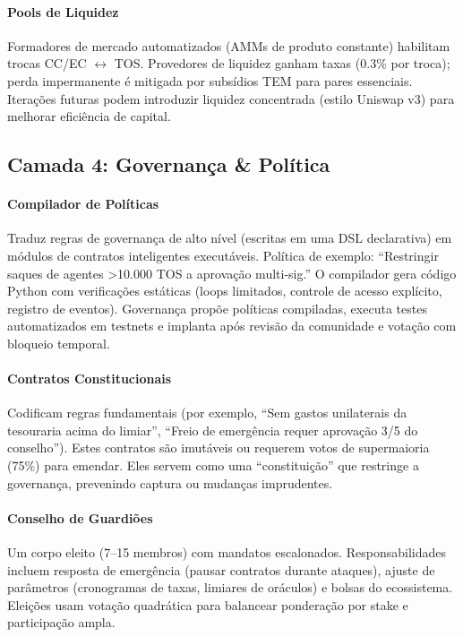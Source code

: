 \documentclass[11pt]{article}
\begin{document}
\paragraph{Pools de Liquidez} Formadores de mercado automatizados (AMMs de produto constante) habilitam trocas CC/EC $\leftrightarrow$ TOS. Provedores de liquidez ganham taxas (0.3\% por troca); perda impermanente é mitigada por subsídios TEM para pares essenciais. Iterações futuras podem introduzir liquidez concentrada (estilo Uniswap v3) para melhorar eficiência de capital.

\subsection{Camada 4: Governança \& Política}
\paragraph{Compilador de Políticas} Traduz regras de governança de alto nível (escritas em uma DSL declarativa) em módulos de contratos inteligentes executáveis. Política de exemplo: ``Restringir saques de agentes >10.000 TOS a aprovação multi-sig.'' O compilador gera código Python com verificações estáticas (loops limitados, controle de acesso explícito, registro de eventos). Governança propõe políticas compiladas, executa testes automatizados em testnets e implanta após revisão da comunidade e votação com bloqueio temporal.

\paragraph{Contratos Constitucionais} Codificam regras fundamentais (por exemplo, ``Sem gastos unilaterais da tesouraria acima do limiar'', ``Freio de emergência requer aprovação 3/5 do conselho''). Estes contratos são imutáveis ou requerem votos de supermaioria (75\%) para emendar. Eles servem como uma ``constituição'' que restringe a governança, prevenindo captura ou mudanças imprudentes.

\paragraph{Conselho de Guardiões} Um corpo eleito (7--15 membros) com mandatos escalonados. Responsabilidades incluem resposta de emergência (pausar contratos durante ataques), ajuste de parâmetros (cronogramas de taxas, limiares de oráculos) e bolsas do ecossistema. Eleições usam votação quadrática para balancear ponderação por stake e participação ampla.
\end{document}

